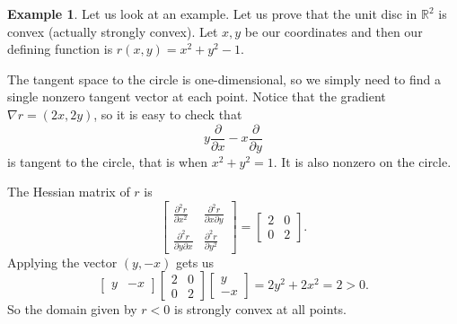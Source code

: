\documentclass[12pt,openany]{book}
\newcommand{\R}{{\mathbb{R}}}
\theoremstyle{plain}
\theoremstyle{remark}
\theoremstyle{definition}
\theoremstyle{exercise}
\theoremstyle{example}
\newtheorem{example}[thm]{Example}
\begin{document}
\begin{example}
Let us look at an example.  Let us prove that the unit disc in $\R^2$ is
convex (actually strongly convex).  Let $x,y$ be our coordinates and then
our defining function is $r(x,y) = x^2+y^2-1$.

The tangent space to the circle is one-dimensional, so we simply need to
find a single nonzero tangent vector at each point.
Notice that the gradient
$\nabla r = (2x,2y)$, so it is easy to check that
\begin{equation*}
y \frac{\partial}{\partial x} - x \frac{\partial}{\partial y}
\end{equation*}
is tangent to the circle, that is when $x^2+y^2=1$.  It is also nonzero on the circle.

The Hessian matrix of $r$ is
\begin{equation*}
\begin{bmatrix}
\frac{\partial^2 r}{\partial x^2} &
\frac{\partial^2 r}{\partial x \partial y} \\
\frac{\partial^2 r}{\partial y \partial x} &
\frac{\partial^2 r}{\partial y^2}
\end{bmatrix}
=
\begin{bmatrix}
2 & 0 \\
0 & 2
\end{bmatrix} .
\end{equation*}
Applying the vector $(y,-x)$ gets us
\begin{equation*}
\begin{bmatrix}
y & -x
\end{bmatrix}
\begin{bmatrix}
2 & 0 \\
0 & 2
\end{bmatrix}
\begin{bmatrix}
y \\ -x
\end{bmatrix}
=
2y^2+2x^2 = 2 > 0 .
\end{equation*}
So the domain given by $r < 0$ is strongly convex at all points.
\end{example}
\end{document}
